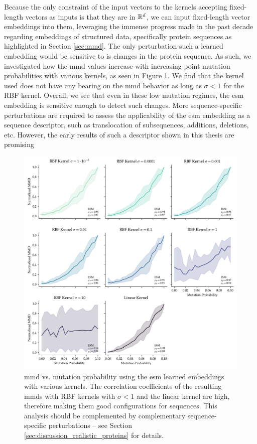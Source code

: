 Because the only constraint of the input vectors to the kernels accepting
fixed-length vectors as inputs is that they are in $\mathbb{R}^d$, we can input
fixed-length vector embeddings into them, leveraging the immense progress made
in the past decade regarding embeddings of structured data, specifically protein
sequences as highlighted in Section \ref{sec:mmd}. The only perturbation such a
learned embedding would be sensitive to is changes in the protein sequence. As
such, we investigated how the \acrshort{mmd} values increase with increasing point mutation
probabilities with various kernels, as seen in Figure \ref{fig:esm_descriptor}.
We find that the kernel used does not have any bearing on the \acrshort{mmd} behavior as
long as $\sigma<1$ for the RBF kernel. Overall, we see that even in these low
mutation regimes, the \acrshort{esm} embedding is sensitive enough to detect such changes.
More sequence-specific perturbations are required to assess the
applicability of the \acrshort{esm} embedding as a sequence descriptor, such as
translocation of subsequences, additions, deletions, etc. However, the early
results of such a descriptor shown in this thesis are promising

\begin{figure}
  \centering
  \includegraphics[width=\textwidth]{./figures/results/res_5.pdf}
  \caption[\acrshort{mmd} using \acrshort{esm} embeddings.]{\acrshort{mmd} vs. mutation probability using the \acrshort{esm}
learned embeddings with various kernels. The correlation coefficients of the
resulting \acrshort{mmd}s with RBF kernels with $\sigma<1$ and the linear kernel are high,
therefore making them good configurations for sequences. This analysis should be
complemented by complementary sequence-specific perturbations -- see Section
\ref{sec:discussion_realistic_proteins} for details.}
  \label{fig:esm_descriptor}
\end{figure}



